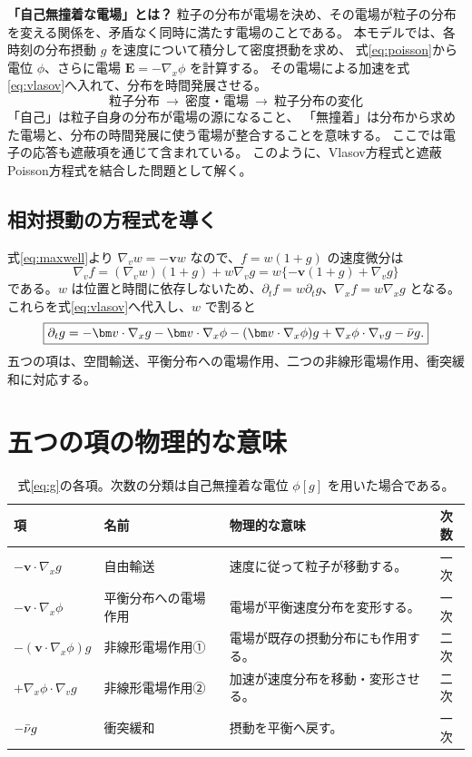 \begin{notebox}
\textbf{「自己無撞着な電場」とは？}
粒子の分布が電場を決め、その電場が粒子の分布を変える関係を、矛盾なく同時に満たす電場のことである。
本モデルでは、各時刻の分布摂動 $g$ を速度について積分して密度摂動を求め、
式\eqref{eq:poisson}から電位 $\phi$、さらに電場 $\bm E=-\nabla_x\phi$ を計算する。
その電場による加速を式\eqref{eq:vlasov}へ入れて、分布を時間発展させる。
\[
\text{粒子分布}\ \longrightarrow\ \text{密度・電場}
\ \longrightarrow\ \text{粒子分布の変化}
\]
「自己」は粒子自身の分布が電場の源になること、
「無撞着」は分布から求めた電場と、分布の時間発展に使う電場が整合することを意味する。
ここでは電子の応答も遮蔽項を通じて含まれている。
このように、Vlasov方程式と遮蔽Poisson方程式を結合した問題として解く。
\end{notebox}

\subsection{相対摂動の方程式を導く}
式\eqref{eq:maxwell}より $\nabla_vw=-\bm v w$ なので、$f=w(1+g)$ の速度微分は
\[
\nabla_vf=(\nabla_vw)(1+g)+w\nabla_vg
=w\{-\bm v(1+g)+\nabla_vg\}
\]
である。$w$ は位置と時間に依存しないため、$\partial_tf=w\partial_tg$、$\nabla_xf=w\nabla_xg$ となる。
これらを式\eqref{eq:vlasov}へ代入し、$w$ で割ると
\begin{equation}
\boxed{\partial_tg=-\bm v\cdot\nabla_xg-\bm v\cdot\nabla_x\phi
 -(\bm v\cdot\nabla_x\phi)g+\nabla_x\phi\cdot\nabla_vg-\nuu g.}
\label{eq:g}
\end{equation}
五つの項は、空間輸送、平衡分布への電場作用、二つの非線形電場作用、衝突緩和に対応する。

\section{五つの項の物理的な意味}
\begin{table}[htbp]
\centering\small
\caption{式\eqref{eq:g}の各項。次数の分類は自己無撞着な電位 $\phi[g]$ を用いた場合である。}
\begin{tabularx}{\textwidth}{lXXc}
\toprule 項 & 名前 & 物理的な意味 & 次数 \\\midrule
$-\bm v\cdot\nabla_xg$ & 自由輸送 & 速度に従って粒子が移動する。 & 一次\\
$-\bm v\cdot\nabla_x\phi$ & 平衡分布への電場作用 & 電場が平衡速度分布を変形する。 & 一次\\
$-(\bm v\cdot\nabla_x\phi)g$ & 非線形電場作用① & 電場が既存の摂動分布にも作用する。 & 二次\\
$+\nabla_x\phi\cdot\nabla_vg$ & 非線形電場作用② & 加速が速度分布を移動・変形させる。 & 二次\\
$-\bar\nu g$ & 衝突緩和 & 摂動を平衡へ戻す。 & 一次\\
\bottomrule
\end{tabularx}
\end{table}

